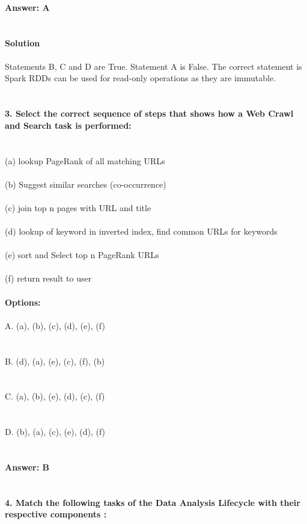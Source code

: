 \documentclass[prl,twocolumn,showpacs,preprintnumbers,superscriptaddress]{revtex4}
\theoremstyle{plain}
\theoremstyle{definition}
\begin{document}
\begin{widetext}
\\
\\
\\
\textbf{Answer: A}
\\
\\
\\
\textbf{Solution}
\\
\\
Statements B, C and D are True. Statement A is False. The correct statement is Spark
RDDs can be used for read-only operations as they are immutable.
\\
\\
\\
\textbf{3. Select the correct sequence of steps that shows how a Web Crawl and Search task is performed:}
\\
\\
\\
(a) lookup PageRank of all matching URLs
\\
\\
(b) Suggest similar searches (co-occurrence)
\\
\\
(c) join top n pages with URL and title
\\
\\
(d) lookup of keyword in inverted index, find common URLs for keywords
\\
\\
(e) sort and Select top n PageRank URLs
\\
\\
(f) return result to user
\\
\\
\textbf{Options:}
\\
\\
\noindent A. (a), (b), (c), (d), (e), (f)
\\
\\
\\
B. (d), (a), (e), (c), (f), (b)
\\
\\
\\
C. (a), (b), (e), (d), (c), (f)
\\
\\
\\
D. (b), (a), (c), (e), (d), (f)
\\
\\
\\
\textbf{Answer: B}
\\
\\
\\
\textbf{4. Match the following tasks of the Data Analysis Lifecycle with their respective components :
}
\end{widetext}
\end{document}
